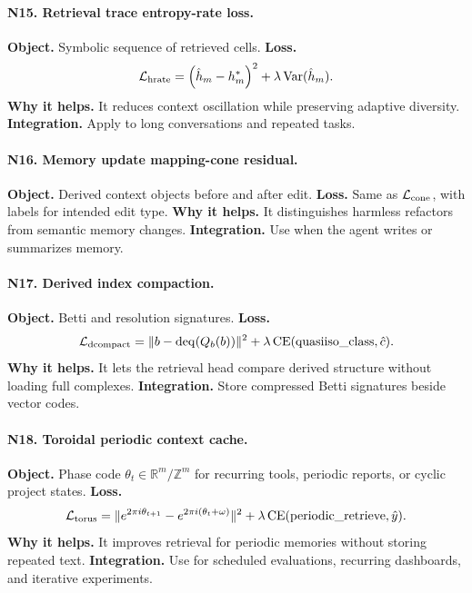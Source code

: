\documentclass[11pt]{article}
\newcommand{\RR}{\mathbb{R}}
\newcommand{\ZZ}{\mathbb{Z}}
\newcommand{\loss}{\mathcal{L}}
\numberwithin{equation}{section}
\begin{document}
\paragraph{N15. Retrieval trace entropy-rate loss.}
\textbf{Object.} Symbolic sequence of retrieved cells. \textbf{Loss.}
\begin{equation}
\loss_{\rm hrate}=\left(\hat h_m-h_m^*\right)^2+\lambda\operatorname{Var}(\hat h_m).
\end{equation}
\textbf{Why it helps.} It reduces context oscillation while preserving adaptive diversity. \textbf{Integration.} Apply to long conversations and repeated tasks.

\paragraph{N16. Memory update mapping-cone residual.}
\textbf{Object.} Derived context objects before and after edit. \textbf{Loss.} Same as $\loss_{\rm cone}$, with labels for intended edit type. \textbf{Why it helps.} It distinguishes harmless refactors from semantic memory changes. \textbf{Integration.} Use when the agent writes or summarizes memory.

\paragraph{N17. Derived index compaction.}
\textbf{Object.} Betti and resolution signatures. \textbf{Loss.}
\begin{equation}
\loss_{\rm dcompact}=\|b-\operatorname{deq}(Q_b(b))\|^2+\lambda\operatorname{CE}(\mathrm{quasiiso\_class},\hat c).
\end{equation}
\textbf{Why it helps.} It lets the retrieval head compare derived structure without loading full complexes. \textbf{Integration.} Store compressed Betti signatures beside vector codes.

\paragraph{N18. Toroidal periodic context cache.}
\textbf{Object.} Phase code $\theta_t\in\RR^m/\ZZ^m$ for recurring tools, periodic reports, or cyclic project states. \textbf{Loss.}
\begin{equation}
\loss_{\rm torus}=\|e^{2\pi i\theta_{t+1}}-e^{2\pi i(\theta_t+\omega)}\|^2+\lambda\operatorname{CE}(\mathrm{periodic\_retrieve},\hat y).
\end{equation}
\textbf{Why it helps.} It improves retrieval for periodic memories without storing repeated text. \textbf{Integration.} Use for scheduled evaluations, recurring dashboards, and iterative experiments.
\end{document}

